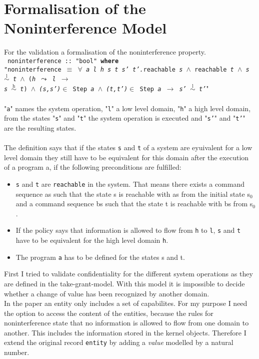 \section{Formalisation of the Noninterference Model}\label{FormNon}
For the validation a formalisation of the noninterference property. \\ 

{
\texttt{
noninterference :: "bool" \textbf{where} \\
"noninterference $\equiv$ $\forall$ \textit{a l h s t s' t'.}reachable \textit{s} $\wedge$ reachable \textit{t} $\wedge$ \textit{s $\overset{\text{l}}{\sim}$ t} $\wedge$ (\textit{h $\leadsto$ l $\longrightarrow$ \\
 s $\overset{\text{h}}{\sim}$ t}) $\wedge$ \textit{(s,s')}$\in$ Step \textit{a} $\wedge$ \textit{(t,t')}$\in$ Step \textit{a} $\longrightarrow$ \textit{s' $\overset{\text{l}}{\sim}$ t'}}"} \\ \\

"\texttt{a}" names the system operation, "\texttt{l}" a low level domain, "\texttt{h}" a high level domain, from the states "\texttt{s}" and "\texttt{t}" the system operation is executed and "\texttt{s'}" and "\texttt{t'}" are the resulting states. \\ \\
The definition says that if the states \texttt{s} and \texttt{t} of a system are eyuivalent for a low level domain they still have to be equivalent for this domain after the execution of a program a, if the following preconditions are fulfilled: \\
\begin{itemize}
\item \texttt{s} and \texttt{t} are \texttt{reachable} in the system. That means there exists a command sequence as such that the state s is reachable with as from the initial state s$_0$ and a command sequence bs such that the state t is reachable with bs from s$_0$.
\item If the policy says that information is allowed to flow from \texttt{h} to \texttt{l}, \texttt{s} and \texttt{t} have to be equivalent for the high level domain \texttt{h}.
\item The program \texttt{a} has to be defined for the states s and t.
\end{itemize}
First I tried to validate confidentiality for the different system operations as they are defined in the take-grant-model. With this model it is impossible to decide whether a change of value has been recognized by another domain. \\
In the paper an entity only includes a set of capabilites. For my purpose I need the option to access the content of the entities, because the rules for noninterference state that no information is allowed to flow from one domain to another. This includes the information stored in the kernel objects. 
Therefore I extend the original record \texttt{entity} by adding a \textit{value} modelled by a natural number. \\ 

